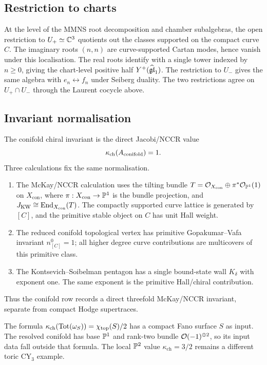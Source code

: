 \subsection*{Restriction to charts}

At the level of the MMNS root decomposition and chamber subalgebras,
the open restriction to $U_+\simeq\mathbb{C}^3$ quotients out the classes
supported on the compact curve $C$.  The imaginary roots
$(n,n)$ are curve-supported Cartan modes, hence vanish under this
localisation.  The real roots identify with a single tower indexed by
$n\ge 0$, giving the chart-level positive half $Y^{+}(\widehat{\mathfrak{gl}}_{1})$.  The
restriction to $U_-$ gives the same algebra with
$e_n\leftrightarrow f_n$ under Seiberg duality.  The two restrictions
agree on $U_+\cap U_-$ through the Laurent cocycle above.

\subsection*{Invariant normalisation}

The conifold chiral invariant is the direct Jacobi/NCCR value
\[
  \kappa_{\mathrm{ch}}(A_{\mathrm{conifold}}) = 1.
\]
Three calculations fix the same normalisation.
\begin{enumerate}
\item The McKay/NCCR calculation uses the tilting bundle
$T=\mathcal{O}_{X_{\mathrm{con}}}\oplus\pi^*\mathcal{O}_{\mathbb{P}^1}(1)$ on
$X_{\mathrm{con}}$, where $\pi:X_{\mathrm{con}}\to\mathbb{P}^1$ is the bundle
projection, and
$J_{\mathrm{KW}}\cong\mathrm{End}_{X_{\mathrm{con}}}(T)$.  The compactly
supported curve lattice is generated by $[C]$, and the primitive
stable object on $C$ has unit Hall weight.
\item The reduced conifold topological vertex has primitive
Gopakumar--Vafa invariant $n^0_{[C]}=1$; all higher degree curve
contributions are multicovers of this primitive class.
\item The Kontsevich--Soibelman pentagon has a single bound-state wall
$K_\delta$ with exponent one.  The same exponent is the primitive
Hall/chiral contribution.
\end{enumerate}
Thus the conifold row records a direct threefold McKay/NCCR invariant,
separate from compact Hodge supertraces.

The formula
$\kappa_{\mathrm{ch}}(\mathrm{Tot}(\omega_S))=\chi_{\mathrm{top}}(S)/2$ has a
compact Fano surface $S$ as input.  The resolved conifold has base
$\mathbb{P}^1$ and rank-two bundle $\mathcal{O}(-1)^{\oplus 2}$, so its input data fall
outside that formula.  The local $\mathbb{P}^2$ value
$\kappa_{\mathrm{ch}}=3/2$ remains a different toric CY$_3$ example.

